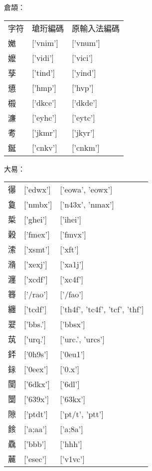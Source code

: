 倉頡：\\
\begin{tabular}[t]{lll}
字符 & 瑲珩編碼 & 原輸入法編碼\\
嬔 & ['vnim'] & ['vnum']\\
嬤 & ['vidi'] & ['vici']\\
孶 & ['tind'] & ['yind']\\
憄 & ['hmp'] & ['hvp']\\
榝 & ['dkce'] & ['dkde']\\
濓 & ['eyhc'] & ['eytc']\\
耉 & ['jkmr'] & ['jkyr']\\
鋋 & ['cnkv'] & ['cnkm']\\
\end{tabular}


大易：\\
\begin{tabular}[t]{lll}
忁 & ['edwx'] & ['eowa', 'eowx']\\
敻 & ['nmbx'] & ['n43x', 'nmax']\\
梊 & ['ghei'] & ['ihei']\\
榖 & ['fmex'] & ['fmvx']\\
溹 & ['xsmt'] & ['xft']\\
潃 & ['xexj'] & ['xa1j']\\
瀍 & ['xcdf'] & ['xc4f']\\
簭 & ['/rao'] & ['/fao']\\
纏 & ['tcdf'] & ['th4f', 'tc4f', 'tcf', 'thf']\\
翇 & ['bbs.'] & ['bbsx']\\
茿 & ['urq.'] & ['urc.', 'urcs']\\
銔 & ['0h9s'] & ['0eu1']\\
銢 & ['0eex'] & ['0.x']\\
閺 & ['6dkx'] & ['6dl']\\
闅 & ['639x'] & ['63kx']\\
隙 & ['ptdt'] & ['pt/t', 'ptt']\\
餩 & ['a;aa'] & ['a;8a']\\
驫 & ['bbb'] & ['hhh']\\
麉 & ['esec'] & ['v1vc']\\
\end{tabular}


